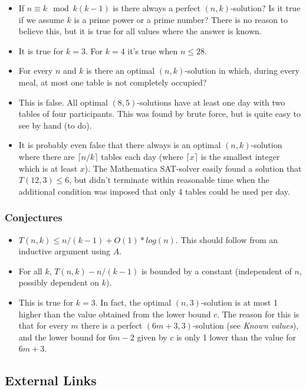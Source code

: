 \documentclass[a4paper]{article}
\begin{document}
\begin{itemize}

\item
  If $n\equiv k\mod k(k-1)$ is there always a perfect
  $(n,k)$-solution? Is it true if we assume $k$ is a prime
  power or a prime number? There is no reason to believe this, but it is
  true for all values where the answer is known.
\item
  It is true for $k=3$. For $k=4$ it's true when
  $n\leq 28$.
\item
  For every $n$ and $k$ is there an optimal
  $(n,k)$-solution in which, during every meal, at most one table
  is not completely occupied?
\item
  This is false. All optimal $(8,5)$-solutions have at least one
  day with two tables of four participants. This was found by brute
  force, but is quite easy to see by hand (to do).
\item
  It is probably even false that there always is an optimal
  $(n,k)$-solution where there are $\lceil n/k\rceil$ tables each
  day (where $\lceil x\rceil$ is the smallest integer which is at least
  $x$). The Mathematica SAT-solver easily found a solution that
  $T(12,3)\leq 6$, but didn't terminate within reasonable time
  when the additional condition was imposed that only 4 tables could be
  used per day.
\end{itemize}

\subsubsection{Conjectures}\label{conjectures}

\begin{itemize}

\item
  $T(n,k)\leq n/(k-1)+O(1)*log(n)$. This should follow
  from an inductive argument using $A$.
\item
  For all $k$, $T(n,k)-n/(k-1)$ is bounded by a
  constant (independent of $n$, possibly dependent on
  $k$).
\item
  This is true for $k=3$. In fact, the optimal
  $(n,3)$-solution is at most 1 higher than the value obtained
  from the lower bound $c$. The reason for this is that for every
  $m$ there is a perfect $(6m+3,3)$-solution (see
  \emph{Known values}), and the lower bound for $6m-2$ given by
  $c$ is only 1 lower than the value for $6m+3$.
\end{itemize}

\subsection{External Links}\label{external-links}
\end{document}
